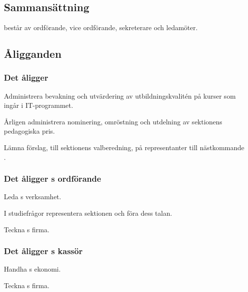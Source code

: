 \section{\SNITFULL}


\subsection{Sammansättning}
\SNIT{} består av ordförande, vice ordförande, sekreterare och ledamöter.

\subsection{Åligganden}

\subsubsection{Det åligger \SNIT}

\begin{att}
	\item Administrera bevakning och utvärdering av utbildningskvalitén på kurser som ingår i IT-programmet.
	\item Årligen administrera nominering, omröstning och utdelning av sektionens pedagogiska pris.
	\item Lämna förslag, till sektionens valberedning, på representanter till nästkommande \SNIT.
\end{att}

\subsubsection{Det åligger \SNIT{}s ordförande}
\begin{att}
	\item Leda \SNIT{}s verksamhet.
	\item I studiefrågor representera sektionen och föra dess talan.
	\item Teckna \SNIT{}s firma.
\end{att}

\subsubsection{Det åligger \SNIT{}s kassör}
\begin{att}
	\item Handha \SNIT{}s ekonomi.
	\item Teckna \SNIT{}s firma.
\end{att}

